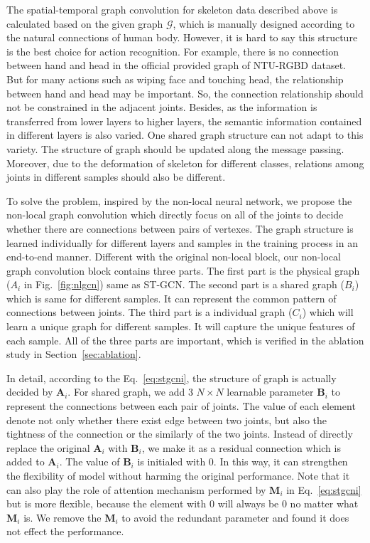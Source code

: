 \documentclass[10pt,twocolumn,letterpaper]{article}
\begin{document}
    The spatial-temporal graph convolution for skeleton data described above is calculated based on the given graph $\mathcal{G}$, which is manually designed according to the natural connections of human body. However, it is hard to say this structure is the best choice for action recognition. For example, there is no connection between hand and head in the official provided graph of NTU-RGBD dataset. But for many actions such as wiping face and touching head, the relationship between hand and head may be important. So, the connection relationship should not be constrained in the adjacent joints.
Besides, as the information is transferred from lower layers to higher layers, the semantic information contained in different layers is also varied. One shared graph structure can not adapt to this variety. The structure of graph should be updated along the message passing. Moreover, due to the deformation of skeleton for different classes, relations among joints in different samples should also be different. 

    To solve the problem, inspired by the non-local neural network, we propose the non-local graph convolution which directly focus on all of the joints to decide whether there are connections between pairs of vertexes. The graph structure is learned individually for different layers and samples in the training process in an end-to-end manner. Different with the original non-local block, our non-local graph convolution block contains three parts. The first part is the physical graph ($A_i$ in Fig.~\ref{fig:nlgcn}) same as ST-GCN. The second part is a shared graph ($B_i$) which is same for different samples. It can represent the common pattern of connections between joints. The third part is a individual graph ($C_i$) which will learn a unique graph for different samples. It will capture the unique features of each sample. All of the three parts are important, which is verified in the ablation study in Section~\ref{sec:ablation}.
    
    In detail, according to the Eq.~\ref{eq:stgcni}, the structure of graph is actually decided by $\mathbf{A}_i$. For shared graph, we add $3$ $N\times N$ learnable parameter $\mathbf{B}_i$ to represent the connections between each pair of joints. The value of each element denote not only whether there exist edge between two joints, but also the tightness of the connection or the similarly of the two joints. Instead of directly replace the original $\mathbf{A}_i$ with $\mathbf{B}_i$, we make it as a residual connection which is added to $\mathbf{A}_i$. The value of $\mathbf{B}_i$ is initialed with 0. In this way, it can strengthen the flexibility of model without harming the original performance. 
    Note that it can also play the role of attention mechanism performed by $\mathbf{M}_i$ in Eq.~\ref{eq:stgcni} but is more flexible, because the element with $0$ will always be $0$ no matter what $\mathbf{M}_i$ is. We remove the $\mathbf{M}_i$ to avoid the redundant parameter and found it does not effect the performance.
    
\end{document}
